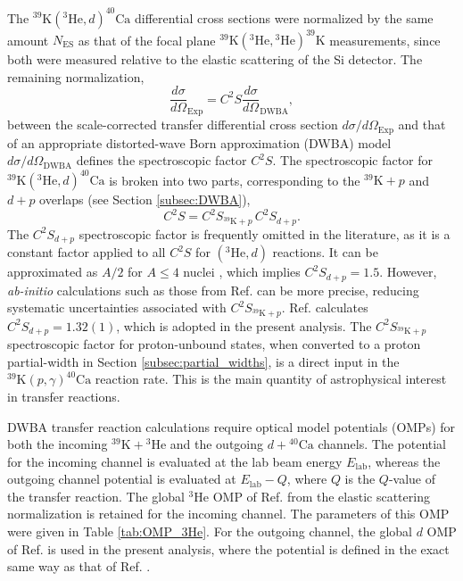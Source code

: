 The $^{39}\mathrm{K}(^{3}\mathrm{He},d)^{40}\mathrm{Ca}$ differential cross sections were normalized by the same amount $N_{\mathrm{ES}}$ as that of the focal plane $^{39}\mathrm{K}(^{3}\mathrm{He}, {}^{3}\mathrm{He})^{39}\mathrm{K}$ measurements, since both were measured relative to the elastic scattering of the Si detector. The remaining normalization,
\begin{equation} \label{eqn:spec_factor_dwba}
\frac{d\sigma}{d\Omega}_{\mathrm{Exp}} = C^{2}S \frac{d\sigma}{d\Omega}_{\mathrm{DWBA}},
\end{equation}
between the scale-corrected transfer differential cross section $d\sigma/d\Omega_{\mathrm{Exp}}$ and that of an appropriate distorted-wave Born approximation (DWBA) model $d\sigma/d\Omega_{\mathrm{DWBA}}$ defines the spectroscopic factor $C^{2}S$. The spectroscopic factor for $^{39}\mathrm{K}(^{3}\mathrm{He},d)^{40}\mathrm{Ca}$ is broken into two parts, corresponding to the $^{39}\mathrm{K}+p$ and $d+p$ overlaps (see Section \ref{subsec:DWBA}),
\begin{equation}
C^{2}S = C^{2}S_{^{39}\mathrm{K}+p} \, C^{2}S_{d+p}.
\end{equation}
The $C^{2}S_{d+p}$ spectroscopic factor is frequently omitted in the literature, as it is a constant factor applied to all $C^{2}S$ for $(^{3}\mathrm{He},d)$ reactions. It can be approximated as $A/2$ for $A \leq 4$ nuclei \cite{Satchler1983}, which implies $C^{2}S_{d+p} = 1.5$. However, \emph{ab-initio} calculations such as those from Ref. \cite{Brida2011} can be more precise, reducing systematic uncertainties associated with $C^{2}S_{^{39}\mathrm{K}+p}$. Ref. \cite{Brida2011} calculates $C^{2}S_{d+p} = 1.32(1)$, which is adopted in the present analysis. The $C^{2}S_{^{39}\mathrm{K}+p}$ spectroscopic factor for proton-unbound states, when converted to a proton partial-width in Section \ref{subsec:partial_widths}, is a direct input in the $^{39}\mathrm{K}(p,\gamma)^{40}\mathrm{Ca}$ reaction rate. This is the main quantity of astrophysical interest in transfer reactions.

DWBA transfer reaction calculations require optical model potentials (OMPs) for both the incoming $^{39}\mathrm{K} + {}^{3}\mathrm{He}$ and the outgoing $d + {}^{40}\mathrm{Ca}$ channels. The potential for the incoming channel is evaluated at the lab beam energy $E_{\mathrm{lab}}$, whereas the outgoing channel potential is evaluated at $E_{\mathrm{lab}} - Q$, where $Q$ is the $Q$-value of the transfer reaction. The global $^{3}$He OMP of Ref. \cite{Liang2009} from the elastic scattering normalization is retained for the incoming channel. The parameters of this OMP were given in Table \ref{tab:OMP_3He}. For the outgoing channel, the global $d$ OMP of Ref. \cite{An2006} is used in the present analysis, where the potential is defined in the exact same way as that of Ref. \cite{Liang2009}.


